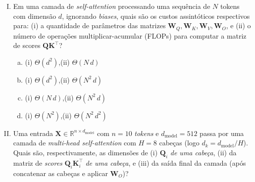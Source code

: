 \documentclass{dlproblemset}
\begin{document}
\begin{enumerate}[I)]
\item {} Em uma camada de \textit{self-attention}
      processando uma sequência de $N$ tokens com dimensão $d$, ignorando
      \textit{biases}, quais são os custos assintóticos respectivos para:
      (i) a quantidade de parâmetros das matrizes $\mathbf{W}_Q, \mathbf{W}_K, \mathbf{W}_V, \mathbf{W}_O$,
      e (ii) o número de operações multiplicar-acumular (FLOPs) para
      computar a matriz de scores $\mathbf{Q} \mathbf{K}^\top$?

\begin{enumerate}[a)]
    \item (i) $\Theta(d^2)$,\quad (ii) $\Theta(N\, d)$
    \item (i) $\Theta(d^2)$,\quad (ii) $\Theta(N^2\, d)$
    \item (i) $\Theta(N\, d)$,\quad (ii) $\Theta(N^2\, d)$
    \item (i) $\Theta(N^2)$,\quad (ii) $\Theta(N^2\, d^2)$
\end{enumerate}

\item Uma entrada $\mathbf{X} \in \mathbb{R}^{n \times d_{\text{model}}}$ com $n = 10$ \textit{tokens} e $d_{\text{model}} = 512$ passa por uma camada de \textit{multi-head self-attention} com $H = 8$ cabeças (logo $d_k = d_{\text{model}}/H$). Quais são, respectivamente, as dimensões de (i) $\mathbf{Q}_i$ \emph{de uma cabeça}, (ii) da matriz de \textit{scores} $\mathbf{Q}_i \mathbf{K}_i^\top$ \emph{de uma cabeça}, e (iii) da saída final da camada (após concatenar as cabeças e aplicar $\mathbf{W}_O$)?


\end{enumerate}
\end{document}
